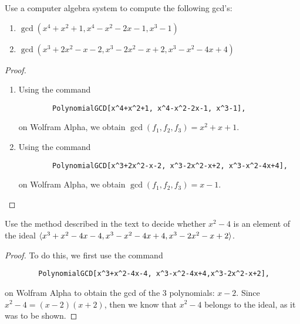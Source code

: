 \begin{exercise}{8}
Use a computer algebra system to compute the following gcd's:
\begin{enumerate}
    \item $\gcd(x^4+x^2+1, x^4-x^2-2x-1, x^3-1)$
    \item $\gcd(x^3+2x^2-x-2, x^3-2x^2-x+2, x^3-x^2-4x+4)$
\end{enumerate}
\end{exercise}
\begin{proof}
\begin{enumerate}
    \item Using the command 
    \begin{verbatim}
        PolynomialGCD[x^4+x^2+1, x^4-x^2-2x-1, x^3-1],
    \end{verbatim}
    on Wolfram Alpha, we obtain $\gcd(f_1, f_2, f_3)=x^2+x+1$.
    \item Using the command 
    \begin{verbatim}
        PolynomialGCD[x^3+2x^2-x-2, x^3-2x^2-x+2, x^3-x^2-4x+4],
    \end{verbatim}
    on Wolfram Alpha, we obtain $\gcd(f_1, f_2, f_3)=x-1$.
\end{enumerate}
\end{proof}

\begin{exercise}{9}
Use the method described in the text to decide whether $x^2-4$ is an element of the ideal $\langle x^3+x^2-4x-4, x^3-x^2-4x+4,x^3-2x^2-x+2\rangle$.
\end{exercise}
\begin{proof}
To do this, we first use the command 
\begin{verbatim}
        PolynomialGCD[x^3+x^2-4x-4, x^3-x^2-4x+4,x^3-2x^2-x+2],
\end{verbatim}
on Wolfram Alpha to obtain the gcd of the 3 polynomials: $x-2$. 
Since $x^2-4 = (x-2)(x+2)$, then we know that $x^2-4$ belongs to the ideal, as it was to be shown.
\end{proof}

